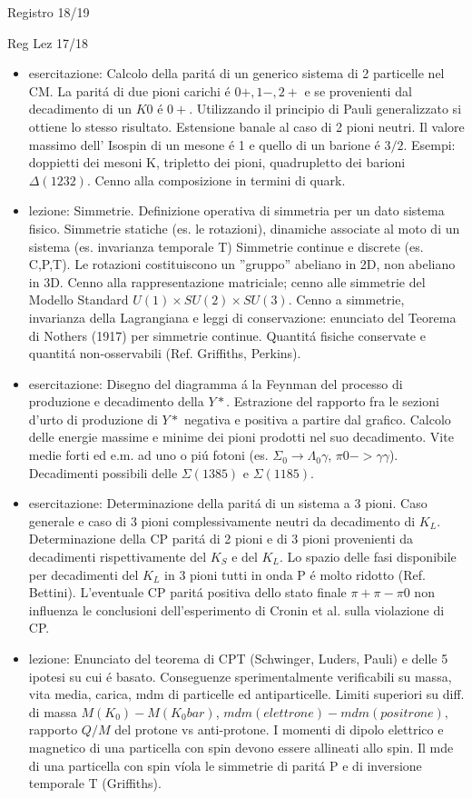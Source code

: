 \begin{frame}{Registro 18/19}
\begin{frame}[allowframebreaks]{Reg Lez 17/18}
\begin{itemize}
\item esercitazione: Calcolo della parit\'a di un generico sistema di 2 particelle nel CM. La parit\'a di due pioni carichi \'e $0+,1-,2+$ e se provenienti dal decadimento di un $K0$ \'e $0+$. Utilizzando il principio di Pauli generalizzato si ottiene lo stesso risultato. Estensione banale al caso di 2 pioni neutri. Il valore massimo dell' Isospin di un mesone \'e 1 e quello di un barione \'e $3/2$. Esempi: doppietti dei mesoni K, tripletto dei pioni, quadrupletto dei barioni $\Delta(1232)$. Cenno alla composizione in termini di quark.

\item lezione: Simmetrie. Definizione operativa di simmetria per un dato sistema fisico. Simmetrie statiche (es. le rotazioni), dinamiche associate al moto di un sistema (es. invarianza temporale T) Simmetrie continue e discrete (es. C,P,T). Le rotazioni costituiscono un ''gruppo'' abeliano in 2D, non abeliano in 3D. Cenno alla rappresentazione matriciale; cenno alle simmetrie del Modello Standard $U(1)\times SU(2)\times SU(3)$. Cenno a simmetrie, invarianza della Lagrangiana e leggi di conservazione: enunciato del Teorema di N\:others (1917) per simmetrie continue. Quantit\'a fisiche conservate e quantit\'a non-osservabili (Ref. Griffiths, Perkins).

\item esercitazione: Disegno del diagramma \'a la Feynman del processo di produzione e decadimento della $Y*$. Estrazione del rapporto fra le sezioni d'urto di produzione di $Y*$ negativa e positiva a partire dal grafico. Calcolo delle energie massime e minime dei pioni prodotti nel suo decadimento. Vite medie forti ed e.m. ad uno o pi\'u fotoni (es. $\Sigma_0\to\Lambda_0 \gamma$, $\pi0->\gamma \gamma$). Decadimenti possibili delle $\Sigma(1385)$ e $\Sigma(1185)$.

\item esercitazione: Determinazione della parit\'a di un sistema a 3 pioni. Caso generale e caso di 3 pioni complessivamente neutri da decadimento di $K_L$. Determinazione della CP parit\'a di 2 pioni e di 3 pioni provenienti da decadimenti rispettivamente del $K_S$ e del $K_L$. Lo spazio delle fasi disponibile per decadimenti del $K_L$ in 3 pioni tutti in onda P \'e molto ridotto (Ref. Bettini). L'eventuale CP parit\'a positiva dello stato finale $\pi+\pi-\pi0$ non influenza le conclusioni dell'esperimento di Cronin et al. sulla violazione di CP.

\item  lezione: Enunciato del teorema di CPT (Schwinger, L\:uders, Pauli) e delle 5 ipotesi su cui \'e basato. Conseguenze sperimentalmente verificabili su massa, vita media, carica, mdm di particelle ed antiparticelle. Limiti superiori su diff. di massa $M(K_0)-M(K_0bar)$, $mdm(elettrone)-mdm(positrone),$ rapporto $Q/M$ del protone vs anti-protone. I momenti di dipolo elettrico e magnetico di una particella con spin devono essere allineati allo spin. Il mde di una particella con spin v\'iola le simmetrie di parit\'a P e di inversione temporale T (Griffiths).


\end{itemize}
\end{frame}
\end{frame}
